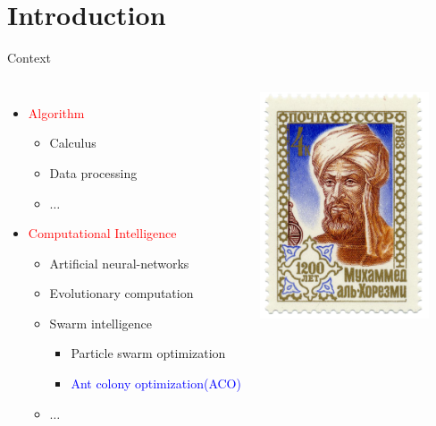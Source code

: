 

\section{Introduction}

\begin{frame}{Context}

\begin{columns}

 \begin{itemize}
  \item \textcolor{red}{Algorithm} %
  \begin{itemize}
   \item Calculus
   \item Data processing
   \item $\dots$
  \end{itemize}
 \item \textcolor{red}{Computational Intelligence}%
 \begin{itemize}
   \item Artificial neural-networks
   \item Evolutionary computation
   \item Swarm intelligence
   \begin{itemize}
     \item Particle swarm optimization
     \item \textcolor{blue}{Ant colony optimization(ACO)}
   \end{itemize}
   \item $\dots$
  \end{itemize}
 \end{itemize}

\begin{center} 
  \includegraphics[width=5cm]{images/al-Khwarizmi.png} 
\end{center} 

\end{columns}

\end{frame}



